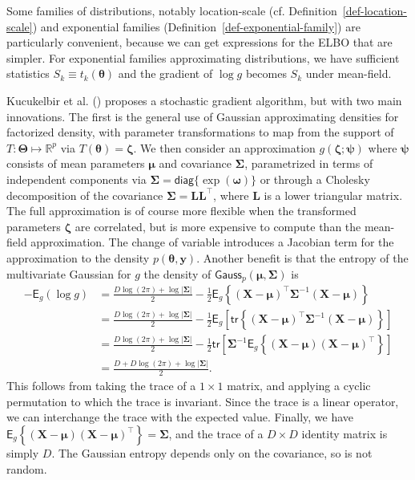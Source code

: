 \documentclass[
  11pt,
  letterpaper,
]{scrbook}
\theoremstyle{plain}
\theoremstyle{definition}
\theoremstyle{definition}
\theoremstyle{plain}
\theoremstyle{plain}
\theoremstyle{definition}
\theoremstyle{remark}
\begin{document}
Some families of distributions, notably location-scale (cf.
Definition~\ref{def-location-scale}) and exponential families
(Definition~\ref{def-exponential-family}) are particularly convenient,
because we can get expressions for the ELBO that are simpler. For
exponential families approximating distributions, we have sufficient
statistics \(S_k \equiv t_k(\boldsymbol{\theta})\) and the gradient of
\(\log g\) becomes \(S_k\) under mean-field.

Kucukelbir et al. () proposes a
stochastic gradient algorithm, but with two main innovations. The first
is the general use of Gaussian approximating densities for factorized
density, with parameter transformations to map from the support of
\(T: \boldsymbol{\Theta} \mapsto \mathbb{R}^p\) via
\(T(\boldsymbol{\theta})=\boldsymbol{\zeta}.\) We then consider an
approximation \(g(\boldsymbol{\zeta}; \boldsymbol{\psi})\) where
\(\boldsymbol{\psi}\) consists of mean parameters \(\boldsymbol{\mu}\)
and covariance \(\boldsymbol{\Sigma}\), parametrized in terms of
independent components via
\(\boldsymbol{\Sigma}=\mathsf{diag}\{\exp(\boldsymbol{\omega})\}\) or
through a Cholesky decomposition of the covariance
\(\boldsymbol{\Sigma} = \mathbf{LL}^\top\), where \(\mathbf{L}\) is a
lower triangular matrix. The full approximation is of course more
flexible when the transformed parameters \(\boldsymbol{\zeta}\) are
correlated, but is more expensive to compute than the mean-field
approximation. The change of variable introduces a Jacobian term for the
approximation to the density \(p(\boldsymbol{\theta}, \boldsymbol{y}).\)
Another benefit is that the entropy of the multivariate Gaussian for
\(g\) the density of
\(\mathsf{Gauss}_p(\boldsymbol{\mu}, \boldsymbol{\Sigma})\) is
\begin{align*}
 - \mathsf{E}_g(\log g) &= \frac{D\log(2\pi) + \log|\boldsymbol{\Sigma}|}{2} - \frac{1}{2}\mathsf{E}_g\left\{ (\boldsymbol{X}-\boldsymbol{\mu})^\top\boldsymbol{\Sigma}^{-1}(\boldsymbol{X}-\boldsymbol{\mu})\right\} \\& = \frac{D\log(2\pi) + \log|\boldsymbol{\Sigma}|}{2} - \frac{1}{2}\mathsf{E}_g\left[ \mathsf{tr}\left\{(\boldsymbol{X}-\boldsymbol{\mu})^\top\boldsymbol{\Sigma}^{-1}(\boldsymbol{X}-\boldsymbol{\mu})\right\}\right]
 \\& =  \frac{D\log(2\pi) + \log|\boldsymbol{\Sigma}|}{2} - \frac{1}{2}\mathsf{tr}\left[\boldsymbol{\Sigma}^{-1}\mathsf{E}_g\left\{(\boldsymbol{X}-\boldsymbol{\mu})(\boldsymbol{X}-\boldsymbol{\mu})^\top\right\}\right]
 \\& =\frac{D+D\log(2\pi) + \log |\boldsymbol{\Sigma}|}{2}.
\end{align*} This follows from taking the trace of a \(1\times 1\)
matrix, and applying a cyclic permutation to which the trace is
invariant. Since the trace is a linear operator, we can interchange the
trace with the expected value. Finally, we have
\(\mathsf{E}_g\left\{(\boldsymbol{X}-\boldsymbol{\mu})(\boldsymbol{X}-\boldsymbol{\mu})^\top\right\}=\boldsymbol{\Sigma}\),
and the trace of a \(D \times D\) identity matrix is simply \(D\). The
Gaussian entropy depends only on the covariance, so is not random.
\end{document}
